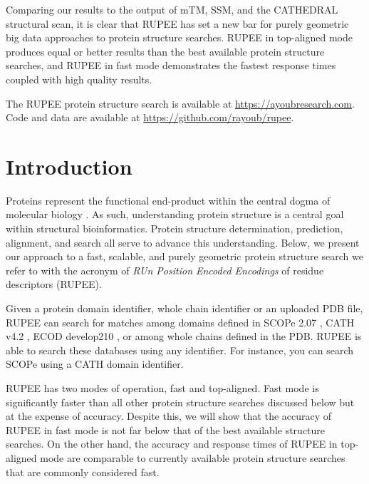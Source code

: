 \documentclass[10pt,letterpaper]{article}
\begin{document}
Comparing our results to the output of mTM, SSM, and the CATHEDRAL structural scan, it is clear that RUPEE has set a new bar for purely geometric big data approaches to protein structure searches.
RUPEE in top-aligned mode produces equal or better results than the best available protein structure searches, and RUPEE in fast mode demonstrates the fastest response times coupled with high quality results. 

The RUPEE protein structure search is available at \url{https://ayoubresearch.com}. 
Code and data are available at \url{https://github.com/rayoub/rupee}.

\linenumbers

\section*{Introduction}

Proteins represent the functional end-product within the central dogma of molecular biology \cite{Crick1970}.
As such, understanding protein structure is a central goal within structural bioinformatics. 
Protein structure determination, prediction, alignment, and search all serve to advance this understanding. 
Below, we present our approach to a fast, scalable, and purely geometric protein structure search we refer to with the acronym of \emph{RUn Position Encoded Encodings} of residue descriptors (RUPEE).

Given a protein domain identifier, whole chain identifier or an uploaded PDB file, RUPEE can search for matches among domains defined in SCOPe 2.07 \cite{Fox2013}, CATH v4.2 \cite{Orengo1997}, ECOD develop210 \cite{Cheng2014}, or among whole chains defined in the PDB.
RUPEE is able to search these databases using any identifier. 
For instance, you can search SCOPe using a CATH domain identifier. 

RUPEE has two modes of operation, fast and top-aligned. 
Fast mode is significantly faster than all other protein structure searches discussed below but at the expense of accuracy.
Despite this, we will show that the accuracy of RUPEE in fast mode is not far below that of the best available structure searches. 
On the other hand, the accuracy and response times of RUPEE in top-aligned mode are comparable to currently available protein structure searches that are commonly considered fast. 
\end{document}
